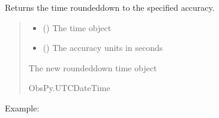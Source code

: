 \documentclass[letterpaper,10pt,english]{sphinxmanual}
\begin{document}

\begin{fulllineitems}
\label{\detokenize{api_core:core.utils.time_floor}}
\pysigstartsignatures
{}
\pysigstopsignatures
\sphinxAtStartPar
Returns the time rounded\sphinxhyphen{}down to the specified accuracy.
\begin{quote}\begin{description}
\begin{itemize}
\item {} 
\sphinxAtStartPar
{} () \textendash{} The time object

\item {} 
\sphinxAtStartPar
{} () \textendash{} The accuracy units in seconds

\end{itemize}

\sphinxAtStartPar
The new rounded\sphinxhyphen{}down time object

\sphinxAtStartPar
ObsPy.UTCDateTime

\end{description}\end{quote}

\sphinxAtStartPar
Example:


\end{fulllineitems}
\end{document}
